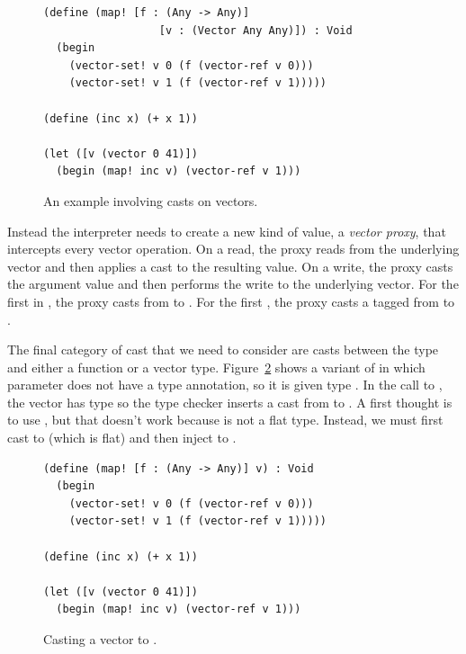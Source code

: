 \documentclass[7x10,nocrop]{TimesAPriori_MIT}%
\begin{document}
\begin{figure}[tbp]
\begin{lstlisting}
(define (map! [f : (Any -> Any)]
                  [v : (Vector Any Any)]) : Void
  (begin
    (vector-set! v 0 (f (vector-ref v 0)))
    (vector-set! v 1 (f (vector-ref v 1)))))

(define (inc x) (+ x 1))

(let ([v (vector 0 41)])
  (begin (map! inc v) (vector-ref v 1)))
\end{lstlisting}
\caption{An example involving casts on vectors.}
\label{fig:map-bang}
\end{figure}

Instead the interpreter needs to create a new kind of value, a
\emph{vector proxy}, that intercepts every vector operation. On a
read, the proxy reads from the underlying vector and then applies a
cast to the resulting value.  On a write, the proxy casts the argument
value and then performs the write to the underlying vector. For the
first  in , the proxy casts
 from  to .  For the first
, the proxy casts a tagged  from 
to .

The final category of cast that we need to consider are casts between
the  type and either a function or a vector
type. Figure~\ref{fig:map-any} shows a variant of 
in which parameter  does not have a type annotation, so it is
given type . In the call to , the vector has
type  so the type checker inserts a
cast from  to . A first
thought is to use , but that doesn't work because
 is not a flat type. Instead, we must
first cast to  (which is flat) and then inject
to .

\begin{figure}[tbp]
\begin{lstlisting}
(define (map! [f : (Any -> Any)] v) : Void
  (begin
    (vector-set! v 0 (f (vector-ref v 0)))
    (vector-set! v 1 (f (vector-ref v 1)))))

(define (inc x) (+ x 1))

(let ([v (vector 0 41)])
  (begin (map! inc v) (vector-ref v 1)))
\end{lstlisting}
\caption{Casting a vector to .}
\label{fig:map-any}
\end{figure}
\end{document}
